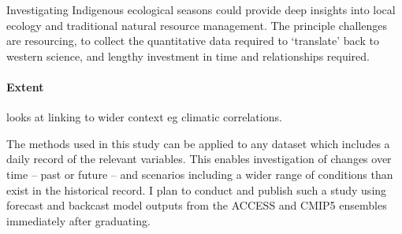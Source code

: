 Investigating Indigenous ecological seasons could provide deep insights
into local ecology and traditional natural resource management.
The principle challenges are resourcing, to collect the quantitative
data required to `translate' back to western science, and lengthy
investment in time and relationships required.


\paragraph{Extent} looks at linking to wider context eg climatic correlations.

The methods used in this study can be applied to any dataset which
includes a daily record of the relevant variables.  This enables
investigation of changes over time -- past or future -- and scenarios
including a wider range of conditions than exist in the historical record.
I plan to conduct and publish such a study using forecast and backcast
model outputs from the ACCESS and CMIP5 ensembles immediately
after graduating.


